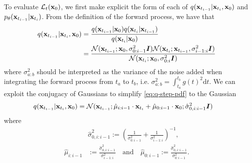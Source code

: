 To evaluate $\mathcal{L}_t({\mathbf{x}}_0)$, we first make explicit the form of each of $q({\mathbf{x}}_{t_{i-1}} | {\mathbf{x}}_{t_i}, {\mathbf{x}}_0)$ and $p_\theta({\mathbf{x}}_{t_{i-1}} | {\mathbf{x}}_{t_i})$. From the definition of the forward process, we have that
\begin{align} \label{eq:q-step-pdf}
    q({\mathbf{x}}_{t_{i-1}} | {\mathbf{x}}_{t_i}, {\mathbf{x}}_0) &= \frac{q({\mathbf{x}}_{t_{i-1}} | {\mathbf{x}}_0) q({\mathbf{x}}_{t_i} | {\mathbf{x}}_{t_{i-1}})}{q({\mathbf{x}}_{t_i}|{\mathbf{x}}_0)} \\
    &= \frac{{\mathcal{N}}({\mathbf{x}}_{t_{i-1}}; {\mathbf{x}}_0, \sigma_{0:i-1}^2 {\bm{I}}) {\mathcal{N}}({\mathbf{x}}_{t_{i}}; {\mathbf{x}}_{t_{i-1}}, \sigma_{i-1:i}^2 {\bm{I}}) }{{\mathcal{N}}({\mathbf{x}}_{t_i}; {\mathbf{x}}_0, \sigma_{0:i}^2 {\bm{I}})}
\end{align}
where $\sigma_{a:b}^2$ should be interpreted as the variance of the noise added when integrating the forward process from $t_a$ to $t_b$, i.e. $\sigma_{a:b}^2 = \int_{t_a}^{t_b} g(t)^2 \mathrm{d}t$. We can exploit the conjugacy of Gaussians to simplify \cref{eq:q-step-pdf} to the Gaussian
\begin{align}
    q({\mathbf{x}}_{t_{i-1}} | {\mathbf{x}}_{t_i}, {\mathbf{x}}_0) &= {\mathcal{N}}( {\mathbf{x}}_{t_{i-1}}; \hat{\mu}_{i:i-1} \cdot {\mathbf{x}}_{t_i} + \hat{\mu}_{0:i-1} \cdot {\mathbf{x}}_0; \hat{\sigma}_{0,i:i-1}^2 {\bm{I}} )
\end{align}
where
\begin{align} \nonumber
    &\hat{\sigma}_{0,i:i-1}^2 := \left( \frac{1}{\sigma_{0:i-1}^2} + \frac{1}{\sigma_{i-1:i}^2} \right)^{-1} , \\
    \nonumber
    \hat{\mu}_{i:i-1} &:= \frac{\hat{\sigma}_{0,i:i-1}^2}{\sigma_{i-1:i}^2} 
    \quad \text{and} \quad
    \hat{\mu}_{0:i-1} := \frac{\hat{\sigma}_{0,i:i-1}^2}{\sigma_{0:i-1}^2}.
\end{align}

